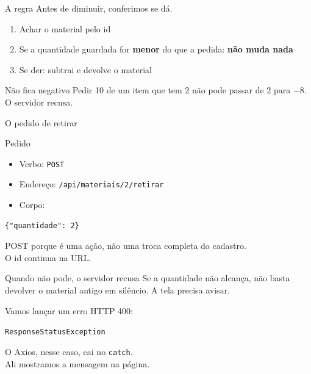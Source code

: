\documentclass[aspectratio=169,11pt]{beamer}
\begin{document}
\begin{frame}{A regra}
  Antes de diminuir, conferimos se dá.

  \vspace{0.5em}
  \begin{enumerate}
    \item Achar o material pelo id
    \item Se a quantidade guardada for \textbf{menor}
          do que a pedida: \textbf{não muda nada}
    \item Se der: subtrai e devolve o material
  \end{enumerate}

  \vspace{0.6em}
  \begin{alertblock}{Não fica negativo}
    Pedir 10 de um item que tem 2 não pode passar de 2
    para $-8$. O servidor recusa.
  \end{alertblock}
\end{frame}

\begin{frame}[fragile]{O pedido de retirar}
  \begin{block}{Pedido}
    \begin{itemize}
      \item Verbo: \texttt{POST}
      \item Endereço: \texttt{/api/materiais/2/retirar}
      \item Corpo:
    \end{itemize}
\begin{lstlisting}[basicstyle=\ttfamily\footnotesize]
{"quantidade": 2}
\end{lstlisting}
  \end{block}

  \vspace{0.3em}
  POST porque é uma ação, não uma troca completa do cadastro.\\
  O id continua na URL.
\end{frame}

\begin{frame}{Quando não pode, o servidor recusa}
  Se a quantidade não alcança, não basta devolver o material
  antigo em silêncio. A tela precisa avisar.

  \vspace{0.5em}
  Vamos lançar um erro HTTP 400:

  \vspace{0.3em}
  \texttt{ResponseStatusException}

  \vspace{0.5em}
  O Axios, nesse caso, cai no \texttt{catch}.\\
  Ali mostramos a mensagem na página.
\end{frame}
\end{document}
